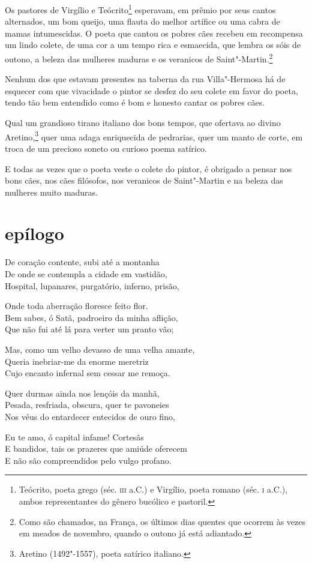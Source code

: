 Os pastores de Virgílio e Teócrito\protect\footnote{ Teócrito, poeta grego (séc. 
\textsc{iii} a.C.) e Virgílio, poeta romano (séc. \textsc{i} a.C.), 
ambos representantes do gênero bucólico e pastoril.} esperavam, em
prêmio por seus cantos alternados, um bom queijo, uma flauta do melhor
artífice ou uma cabra de mamas intumescidas. O poeta que cantou os
pobres cães recebeu em recompensa um lindo colete, de uma cor a um
tempo rica e esmaecida, que lembra os sóis de outono, a beleza das
mulheres maduras e os veranicos de Saint"-Martin.\protect\footnote{ Como são chamados, na França, os
últimos dias quentes que ocorrem às vezes em meados de novembro, quando
o outono já está adiantado.}

Nenhum dos que estavam presentes na taberna da rua Villa"-Hermosa
há de esquecer com que vivacidade o pintor se desfez do seu colete em favor
do poeta, tendo tão bem entendido como é bom e honesto cantar os pobres
cães.

Qual um grandioso tirano italiano dos bons tempos, que ofertava ao divino
Aretino,\protect\footnote{ Aretino (1492"-1557), poeta satírico italiano.}
quer uma adaga enriquecida de pedrarias,
quer um manto de corte, em troca de um precioso soneto ou curioso
poema satírico.

E todas as vezes que o poeta veste o colete do pintor, é obrigado a
pensar nos bons cães, nos cães filósofos, nos veranicos de
Saint"-Martin e na beleza das mulheres muito maduras.

\quebra\section[Epílogo]{epílogo}

\bigskip

\noindent De coração contente, subi até a montanha\\
De onde se contempla a cidade em vastidão,\\
Hospital, lupanares, purgatório, inferno, prisão,\\\medskip

\noindent Onde toda aberração floresce feito flor.\\
Bem sabes, ó Satã, padroeiro da minha aflição,\\
Que não fui até lá para verter um pranto vão;\\\medskip

\noindent Mas, como um velho devasso de uma velha amante,\\
Queria inebriar-me da enorme meretriz\\
Cujo encanto infernal sem cessar me remoça.\\\medskip

\noindent Quer durmas ainda nos lençóis da manhã,\\
Pesada, resfriada, obscura, quer te pavoneies\\ 
Nos véus do entardecer entecidos de ouro fino,\\\medskip

\noindent Eu te amo, ó capital infame! Cortesãs\\
E bandidos, tais os prazeres que amiúde oferecem\\
E não são compreendidos pelo vulgo profano.\\
\vfil

